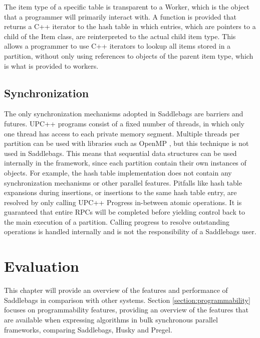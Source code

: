 \documentclass{uit-report}
\begin{document}
The item type of a specific table is transparent to a Worker, which is the object that a programmer will primarily interact with. A function is provided that returns a C++ iterator to the hash table in which entries, which are pointers to a child of the Item class, are reinterpreted to the actual child item type. This allows a programmer to use C++ iterators to lookup all items stored in a partition, without only using references to objects of the parent item type, which is what is provided to workers.

\section{Synchronization}
The only synchronization mechanisms adopted in Saddlebags are barriers and futures. UPC++ programs consist of a fixed number of threads, in which only one thread has access to each private memory segment. Multiple threads per partition can be used with libraries such as OpenMP \cite{openmp}, but this technique is not used in Saddlebags. This means that sequential data structures can be used internally in the framework, since each partition contain their own instances of objects. For example, the hash table implementation does not contain any synchronization mechanisms or other parallel features. Pitfalls like hash table expansions during insertions, or insertions to the same hash table entry, are resolved by only calling UPC++ Progress in-between atomic operations. It is guaranteed that entire RPCs will be completed before yielding control back to the main execution of a partition. Calling progress to resolve outstanding operations is handled internally and is not the responsibility of a Saddlebags user.


%

\newpage
\chapter{Evaluation}
This chapter will provide an overview of the features and performance of Saddlebags in comparison with other systems. Section \ref{section:programmability} focuses on programmability features, providing an overview of the features that are available when expressing algorithms in bulk synchronous parallel frameworks, comparing Saddlebags, Husky and Pregel.
\end{document}
